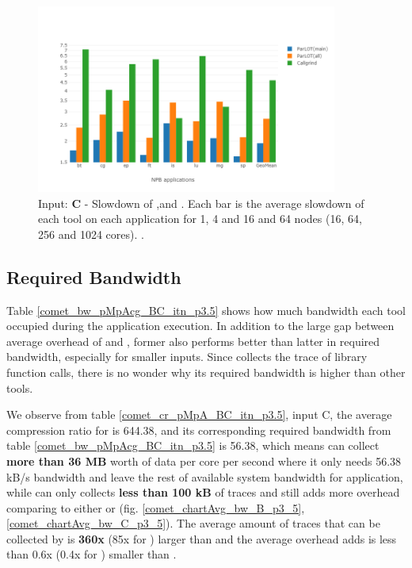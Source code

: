 \begin{figure}[!t]
\centering
\includegraphics[width=3.9in]{figs.comet.newMed/comet_chartAvg_sd_C_p3_5.png}
\caption{ Input: \textbf{C} - Slowdown of \parlotm ,\parlota and \callgrind. Each bar is the average slowdown of each tool on each application for 1, 4 and 16 and 64 nodes (16, 64, 256 and 1024 cores). . 
}
\label{comet_chartAvg_sd_C_p3_5}
\end{figure}






  
\subsection{Required Bandwidth}
\label{subsec:lowbw}



Table \ref{comet_bw_pMpAcg_BC_itn_p3.5} shows how much bandwidth each tool occupied during the application execution. In addition to the large gap between average overhead of \parlotm and \callgrind, former also performs better than latter in required bandwidth, especially for smaller inputs. Since \parlota collects the trace of library function calls, there is no wonder why its required bandwidth is higher than other tools.

We observe from table \ref{comet_cr_pMpA_BC_itn_p3.5}, input C, the average compression ratio for \parlota is 644.38, and its corresponding required bandwidth from table \ref{comet_bw_pMpAcg_BC_itn_p3.5} is 56.38, which means \parlot can collect \textbf{more than 36 MB} worth of data per core per second where it only needs 56.38 kB/s bandwidth and leave the rest of available system bandwidth for application, while \callgrind can only collects \textbf{less than 100 kB} of traces and still adds more overhead comparing to either \parlota or \parlotm (fig. \ref{comet_chartAvg_bw_B_p3_5},\ref{comet_chartAvg_bw_C_p3_5}). The average amount of traces that can be collected by \parlota is \textbf{360x} (85x for \parlotm) larger than \callgrind and the average overhead \parlota adds is less than 0.6x (0.4x for \parlotm) smaller than \callgrind.

